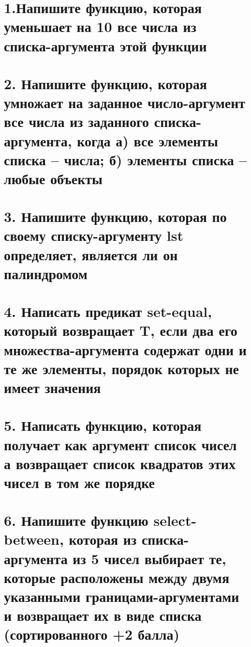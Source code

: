 \section*{1.Напишите функцию, которая уменьшает на 10 все числа из списка-аргумента этой функции}




\section*{2. Напишите функцию, которая умножает на заданное число-аргумент все числа из заданного списка-аргумента, когда а) все элементы списка -- числа; б) элементы списка -- любые объекты}



\section*{3. Напишите функцию, которая по своему списку-аргументу lst определяет, является ли он палиндромом}




\section*{4. Написать предикат set-equal, который возвращает T, если два его множества-аргумента содержат одни и те же элементы, порядок которых не имеет значения}




\section*{5. Написать функцию, которая получает как аргумент список чисел а возвращает список квадратов этих чисел в том же порядке}




\section*{6. Напишите функцию select-between, которая из списка-аргумента из 5 чисел выбирает те, которые расположены между двумя указанными границами-аргументами и возвращает их в виде списка (сортированного +2 балла)}

